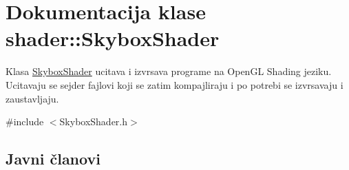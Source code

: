 \hypertarget{classshader_1_1SkyboxShader}{}\section{Dokumentacija klase shader\+:\+:Skybox\+Shader}
\label{classshader_1_1SkyboxShader}


Klasa \hyperlink{classshader_1_1SkyboxShader}{Skybox\+Shader} ucitava i izvrsava programe na Open\+GL Shading jeziku. Ucitavaju se sejder fajlovi koji se zatim kompajliraju i po potrebi se izvrsavaju i zaustavljaju.  




{\ttfamily \#include $<$Skybox\+Shader.\+h$>$}

\subsection*{Javni članovi}
